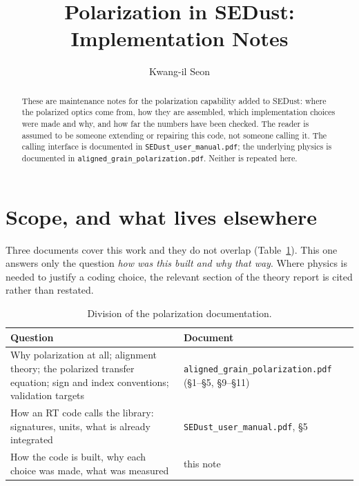 \documentclass{my_memo}
\title{Polarization in SEDust: Implementation Notes}
\author{Kwang-il Seon}
\date{\docmoddate}
\newcommand{\code}[1]{\texttt{#1}}
\begin{document}
\maketitle

\begin{abstract}
\noindent
These are maintenance notes for the polarization capability added to SEDust:
where the polarized optics come from, how they are assembled, which
implementation choices were made and why, and how far the numbers have been
checked. The reader is assumed to be someone extending or repairing this code,
not someone calling it. The calling interface is documented in
\code{SEDust\_user\_manual.pdf}; the underlying physics is documented in
\code{aligned\_grain\_polarization.pdf}. Neither is repeated here.
\end{abstract}

\tableofcontents

\section{Scope, and what lives elsewhere}

Three documents cover this work and they do not overlap
(Table~\ref{tab:whichdoc}). This one answers only the question \emph{how was
this built and why that way}. Where physics is needed to justify a coding
choice, the relevant section of the theory report is cited rather than
restated.

\begin{table}[h]
\centering
\begin{tabular}{@{}p{}p{}@{}}
\toprule
Question & Document \\
\midrule
Why polarization at all; alignment theory; the polarized transfer equation;
sign and index conventions; validation targets &
\code{aligned\_grain\_polarization.pdf} (\S1--\S5, \S9--\S11) \\[2pt]
How an RT code calls the library: signatures, units, what is already
integrated &
\code{SEDust\_user\_manual.pdf}, \S5 \\[2pt]
How the code is built, why each choice was made, what was measured &
this note \\
\bottomrule
\end{tabular}
\caption{Division of the polarization documentation.}
\label{tab:whichdoc}
\end{table}
\end{document}
